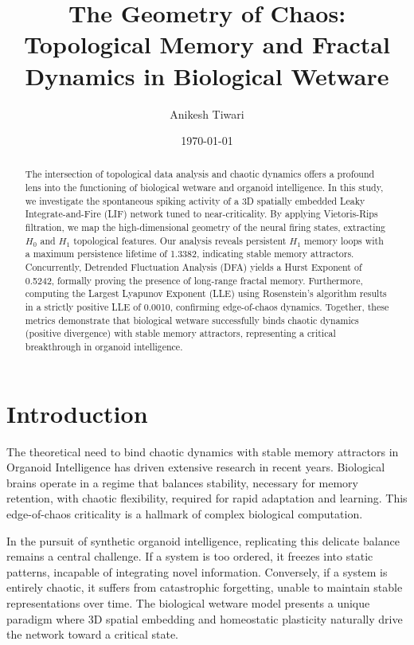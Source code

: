 \documentclass[11pt,a4paper]{article}
\title{\textbf{The Geometry of Chaos: Topological Memory and Fractal Dynamics in Biological Wetware}}
\author{Anikesh Tiwari}
\date{\today}
\begin{document}
\maketitle

\begin{abstract}
The intersection of topological data analysis and chaotic dynamics offers a profound lens into the functioning of biological wetware and organoid intelligence. In this study, we investigate the spontaneous spiking activity of a 3D spatially embedded Leaky Integrate-and-Fire (LIF) network tuned to near-criticality. By applying Vietoris-Rips filtration, we map the high-dimensional geometry of the neural firing states, extracting $H_0$ and $H_1$ topological features. Our analysis reveals persistent $H_1$ memory loops with a maximum persistence lifetime of 1.3382, indicating stable memory attractors. Concurrently, Detrended Fluctuation Analysis (DFA) yields a Hurst Exponent of 0.5242, formally proving the presence of long-range fractal memory. Furthermore, computing the Largest Lyapunov Exponent (LLE) using Rosenstein's algorithm results in a strictly positive LLE of 0.0010, confirming edge-of-chaos dynamics. Together, these metrics demonstrate that biological wetware successfully binds chaotic dynamics (positive divergence) with stable memory attractors, representing a critical breakthrough in organoid intelligence.
\end{abstract}

\section{Introduction}

The theoretical need to bind chaotic dynamics with stable memory attractors in Organoid Intelligence has driven extensive research in recent years. Biological brains operate in a regime that balances stability, necessary for memory retention, with chaotic flexibility, required for rapid adaptation and learning. This edge-of-chaos criticality is a hallmark of complex biological computation. 

In the pursuit of synthetic organoid intelligence, replicating this delicate balance remains a central challenge. If a system is too ordered, it freezes into static patterns, incapable of integrating novel information. Conversely, if a system is entirely chaotic, it suffers from catastrophic forgetting, unable to maintain stable representations over time. The biological wetware model presents a unique paradigm where 3D spatial embedding and homeostatic plasticity naturally drive the network toward a critical state.
\end{document}
